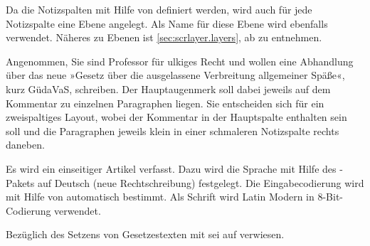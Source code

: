 Da die Notizspalten mit Hilfe von \hyperref[cha:scrlayer]{}%
 definiert werden, wird
auch für jede Notizspalte eine Ebene angelegt. Als
Name für diese Ebene wird ebenfalls
 verwendet. Näheres zu Ebenen
ist \autoref{sec:scrlayer.layers}, ab  zu
entnehmen.
%
\begin{Example}
  Angenommen, Sie sind Professor für ulkiges Recht und wollen eine Abhandlung
  über das neue »Gesetz über die ausgelassene Verbreitung allgemeiner Späße«,
  kurz GüdaVaS, schreiben. Der Hauptaugenmerk soll dabei jeweils auf dem
  Kommentar zu einzelnen Paragraphen liegen. Sie entscheiden sich für ein
  zweispaltiges Layout, wobei der Kommentar in der Hauptspalte enthalten sein
  soll und die Paragraphen jeweils klein in einer
  schmaleren Notizspalte rechts daneben.
  Es wird ein einseitiger Artikel verfasst. Dazu wird die
  Sprache mit Hilfe
  des -Pakets auf Deutsch (neue
  Rechtschreibung) festgelegt. Die Eingabecodierung wird mit Hilfe von
   automatisch bestimmt. Als Schrift
  wird Latin Modern in 8-Bit-Codierung verwendet.

  Bezüglich des Setzens von Gesetzestexten mit
  \hyperref[cha:scrjura]{} sei auf
   verwiesen.


\end{Example}
